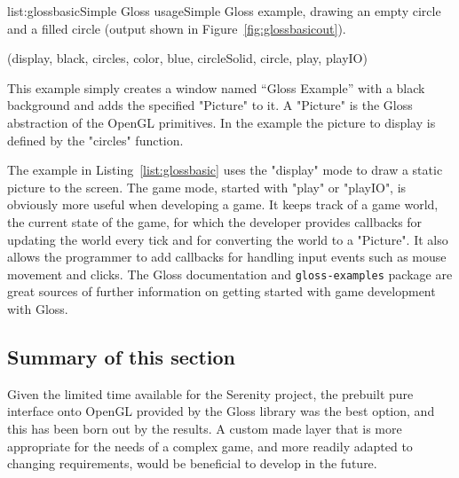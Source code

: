 \vspace{-0.5em}
\begin{listing}{list:glossbasic}{Simple Gloss usage}{Simple Gloss example, drawing an empty circle and a filled circle (output shown in Figure~\ref{fig:glossbasicout}).}{}
\end{listing}\vspace{-1.5em}

\functions(display, black, circles, color, blue, circleSolid, circle, play, playIO)
\noindent
This example simply creates a window named ``Gloss Example'' with a black background and adds the specified "Picture" to it. A "Picture" is the Gloss abstraction of the OpenGL primitives. In the example the picture to display is defined by the "circles" function.

The example in Listing~\ref{list:glossbasic} uses the "display" mode to draw a static picture to the screen. The game mode, started with "play" or "playIO", is obviously more useful when developing a game. It keeps track of a game world, the current state of the game, for which the developer provides callbacks for updating the world every tick and for converting the world to a "Picture". It also allows the programmer to add callbacks for handling input events such as mouse movement and clicks. The Gloss documentation and \texttt{gloss-examples} package are great sources of further information on getting started with game development with Gloss.

\subsection{Summary of this section} 
Given the limited time available for the Serenity project, the prebuilt pure interface onto OpenGL provided by the Gloss library was the best option, and this has been born out by the results. A custom made layer that is more appropriate for the needs of a complex game, and more readily adapted to changing requirements, would be beneficial to develop in the future.
